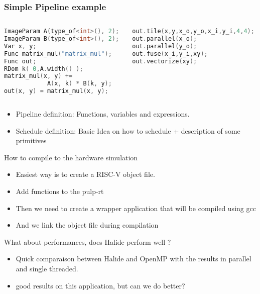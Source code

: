 \documentclass[aspectratio=169]{beamer}
\begin{document}
\begin{frame}[fragile]
	\frametitle{Simple Pipeline example}

	\begin{columns}[T]
		\begin{column}{.5\textwidth}
			\begin{lstlisting}[language=C]
ImageParam A(type_of<int>(), 2);
ImageParam B(type_of<int>(), 2);
Var x, y;
Func matrix_mul("matrix_mul");
Func out;
RDom k( 0,A.width() );
matrix_mul(x, y) +=
			A(x, k) * B(k, y);
out(x, y) = matrix_mul(x, y);

			\end{lstlisting}
		\end{column}
		\begin{column}{.5\textwidth}
			\begin{lstlisting}[language=C]
out.tile(x,y,x_o,y_o,x_i,y_i,4,4);
out.parallel(x_o);
out.parallel(y_o);
out.fuse(x_i,y_i,xy);
out.vectorize(xy);

			\end{lstlisting}
		\end{column}
	\end{columns}

	\begin{itemize}
		\item Pipeline definition: Functions, variables and expressions.
		\item Schedule definition: Basic Idea on how to schedule + description of some primitives
	\end{itemize}
\end{frame}

\begin{frame}{How to compile to the hardware simulation}
	\begin{itemize}
		\item Easiest way is to create a RISC-V object file.
		\item Add functions to the pulp-rt 
		\item Then we need to create a wrapper application that will be compiled using gcc
		\item And we link the object file during compilation
	\end{itemize}
\end{frame}

\begin{frame}{What about performances, does Halide perform well ?}
	\begin{itemize}
		\item Quick comparaison between Halide and OpenMP with the results in parallel and single threaded.
		\item good results on this application, but can we do better?
	\end{itemize}
\end{frame}
\end{document}
